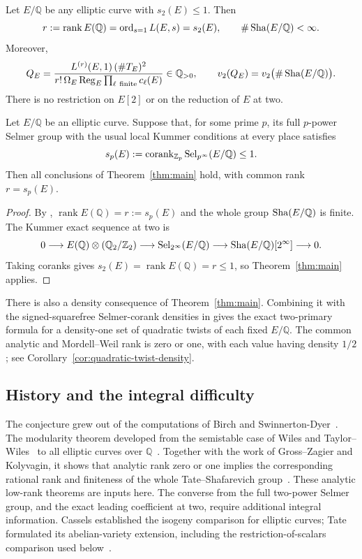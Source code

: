 \begin{theorem}\label{thm:main}
Let \(E/\mathbb Q\) be any elliptic curve with \(s_2(E)\leq1\).
Then
\[
 r:=\operatorname{rank}E(\mathbb Q)
   =\operatorname{ord}_{s=1}L(E,s)=s_2(E),
 \qquad \#\operatorname{Sha}(E/\mathbb Q)<\infty.
\]
Moreover,
\[
 Q_E=\frac{L^{(r)}(E,1)\,(\#T_E)^2}
 {r!\,\Omega_E\operatorname{Reg}_E\prod_{\ell\ \mathrm{finite}}c_\ell(E)}
 \in\mathbb Q_{>0},
 \qquad
 v_2(Q_E)=v_2\bigl(\#\operatorname{Sha}(E/\mathbb Q)\bigr).
\]
There is no restriction on \(E[2]\) or on the reduction of \(E\) at two.
\end{theorem}

\begin{corollary}\label{cor:any-prime-bsd}
Let \(E/\mathbb Q\) be an elliptic curve. Suppose that, for some prime
\(p\), its full \(p\)-power Selmer group with the usual local Kummer
conditions at every place satisfies
\[
 s_p(E):=\operatorname{corank}_{\mathbb Z_p}\operatorname{Sel}_{p^\infty}(E/\mathbb Q)\le1.
\]
Then all conclusions of Theorem~\ref{thm:main} hold, with common rank
\(r=s_p(E)\).
\end{corollary}

\begin{proof}
By \cite[Theorem~1.1]{OpenAIAllPrimeSelmer2026},
\(\operatorname{rank}E(\mathbb Q)=r:=s_p(E)\) and the whole group
\(\operatorname{Sha}(E/\mathbb Q)\) is finite. The Kummer exact sequence at two is
\[
 0\longrightarrow E(\mathbb Q)\otimes(\mathbb Q_2/\mathbb Z_2)
 \longrightarrow\operatorname{Sel}_{2^\infty}(E/\mathbb Q)
 \longrightarrow\operatorname{Sha}(E/\mathbb Q)[2^\infty]\longrightarrow0.
\]
Taking coranks gives \(s_2(E)=\operatorname{rank}E(\mathbb Q)=r\le1\),
so Theorem~\ref{thm:main} applies.
\end{proof}

There is also a density consequence of Theorem~\ref{thm:main}.
Combining it with the signed-squarefree Selmer-corank densities in
\cite[proof of Theorem~1.2]{OpenAIGoldfeldDensity2026} gives the exact
two-primary formula for a density-one set of quadratic twists of each
fixed \(E/\mathbb Q\). The common analytic and Mordell--Weil rank is
zero or one, with each value having density \(1/2\); see
Corollary~\ref{cor:quadratic-twist-density}.

\subsection{History and the integral difficulty}

The conjecture grew out of the computations of Birch and
Swinnerton-Dyer~\cite{BSD65}. The modularity theorem developed from
the semistable case of Wiles and Taylor--Wiles~\cite{Wiles95,TaylorWiles95}
to all elliptic curves over \(\mathbb Q\)~\cite{BCDT01}.
Together with the work of Gross--Zagier and Kolyvagin, it shows that
analytic rank zero or one implies the
corresponding rational rank and finiteness of the whole
Tate--Shafarevich group~\cite{BCDT01,GZ86,Kolyvagin90}. These analytic
low-rank theorems are inputs here. The converse from the full two-power
Selmer group, and the exact leading coefficient at two, require
additional integral information. Cassels established the isogeny
comparison for elliptic curves; Tate formulated its abelian-variety
extension, including the restriction-of-scalars comparison used
below~\cite{Cassels65,Tate1966}.

